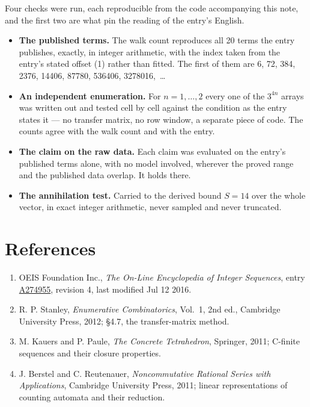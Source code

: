 \documentclass[11pt]{article}
\theoremstyle{definition}
\begin{document}
Four checks were run, each reproducible from the code accompanying this note, and the first two are what pin the reading of the entry's English.

\begin{itemize}

\item {\bfseries The published terms.} The walk count reproduces all 20 terms the entry publishes, exactly, in integer arithmetic, with the index taken from the entry's stated offset (1) rather than fitted. The first of them are 6, 72, 384, 2376, 14406, 87780, 536406, 3278016,~\dots

\item {\bfseries An independent enumeration.} For $n = 1,\dots,2$ every one of the $3^{4n}$ arrays was written out and tested cell by cell against the condition as the entry states it --- no transfer matrix, no row window, a separate piece of code. The counts agree with the walk count and with the entry.

\item {\bfseries The claim on the raw data.} Each claim was evaluated on the entry's published terms alone, with no model involved, wherever the proved range and the published data overlap. It holds there.

\item {\bfseries The annihilation test.} Carried to the derived bound $S = 14$ over the whole vector, in exact integer arithmetic, never sampled and never truncated.

\end{itemize}

\section{References}

\begin{enumerate}

\item OEIS Foundation Inc., \emph{The On-Line Encyclopedia of Integer Sequences}, entry \href{https://oeis.org/A274955}{A274955}, revision 4, last modified Jul 12 2016.

\item R. P. Stanley, \emph{Enumerative Combinatorics}, Vol.~1, 2nd ed., Cambridge University Press, 2012; \S4.7, the transfer-matrix method.

\item M. Kauers and P. Paule, \emph{The Concrete Tetrahedron}, Springer, 2011; C-finite sequences and their closure properties.

\item J. Berstel and C. Reutenauer, \emph{Noncommutative Rational Series with Applications}, Cambridge University Press, 2011; linear representations of counting automata and their reduction.

\end{enumerate}
\end{document}
